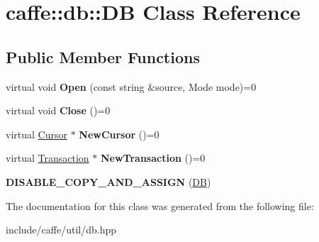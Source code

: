 \hypertarget{classcaffe_1_1db_1_1DB}{}\section{caffe\+:\+:db\+:\+:DB Class Reference}
\label{classcaffe_1_1db_1_1DB}
\subsection*{Public Member Functions}
\begin{DoxyCompactItemize}
\item 
virtual void {\bfseries Open} (const string \&source, Mode mode)=0\hypertarget{classcaffe_1_1db_1_1DB_acb14bf3840539c0ce5bfd294f31adb67}{}\label{classcaffe_1_1db_1_1DB_acb14bf3840539c0ce5bfd294f31adb67}

\item 
virtual void {\bfseries Close} ()=0\hypertarget{classcaffe_1_1db_1_1DB_a1eea40ee9e2017c2aa983e88770486fc}{}\label{classcaffe_1_1db_1_1DB_a1eea40ee9e2017c2aa983e88770486fc}

\item 
virtual \hyperlink{classcaffe_1_1db_1_1Cursor}{Cursor} $\ast$ {\bfseries New\+Cursor} ()=0\hypertarget{classcaffe_1_1db_1_1DB_a5bf502b15bfb2f8fbbf1670bf1a2e93b}{}\label{classcaffe_1_1db_1_1DB_a5bf502b15bfb2f8fbbf1670bf1a2e93b}

\item 
virtual \hyperlink{classcaffe_1_1db_1_1Transaction}{Transaction} $\ast$ {\bfseries New\+Transaction} ()=0\hypertarget{classcaffe_1_1db_1_1DB_a346f1668d90dc24492ffc0d2d9f7097c}{}\label{classcaffe_1_1db_1_1DB_a346f1668d90dc24492ffc0d2d9f7097c}

\item 
{\bfseries D\+I\+S\+A\+B\+L\+E\+\_\+\+C\+O\+P\+Y\+\_\+\+A\+N\+D\+\_\+\+A\+S\+S\+I\+GN} (\hyperlink{classcaffe_1_1db_1_1DB}{DB})\hypertarget{classcaffe_1_1db_1_1DB_aaffc660573d0b233cb2dfecf2e3aabae}{}\label{classcaffe_1_1db_1_1DB_aaffc660573d0b233cb2dfecf2e3aabae}

\end{DoxyCompactItemize}


The documentation for this class was generated from the following file\+:\begin{DoxyCompactItemize}
\item 
include/caffe/util/db.\+hpp\end{DoxyCompactItemize}
